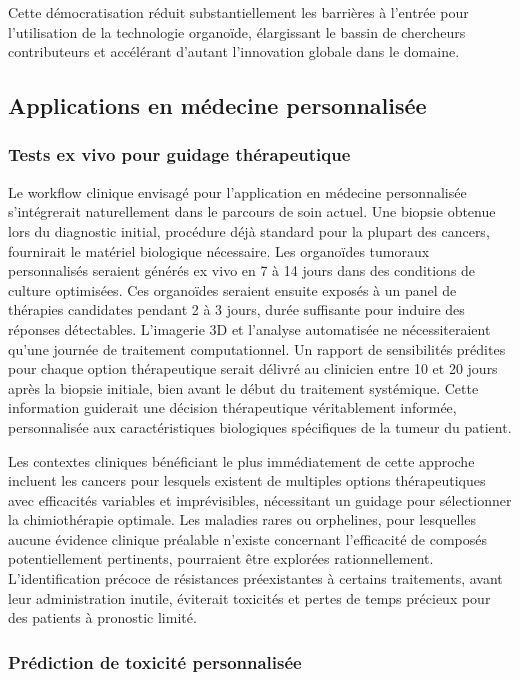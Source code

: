 Cette démocratisation réduit substantiellement les barrières à l'entrée pour l'utilisation de la technologie organoïde, élargissant le bassin de chercheurs contributeurs et accélérant d'autant l'innovation globale dans le domaine.

\subsection{Applications en médecine personnalisée}

\subsubsection{Tests ex vivo pour guidage thérapeutique}

Le workflow clinique envisagé pour l'application en médecine personnalisée s'intégrerait naturellement dans le parcours de soin actuel. Une biopsie obtenue lors du diagnostic initial, procédure déjà standard pour la plupart des cancers, fournirait le matériel biologique nécessaire. Les organoïdes tumoraux personnalisés seraient générés ex vivo en 7 à 14 jours dans des conditions de culture optimisées. Ces organoïdes seraient ensuite exposés à un panel de thérapies candidates pendant 2 à 3 jours, durée suffisante pour induire des réponses détectables. L'imagerie 3D et l'analyse automatisée ne nécessiteraient qu'une journée de traitement computationnel. Un rapport de sensibilités prédites pour chaque option thérapeutique serait délivré au clinicien entre 10 et 20 jours après la biopsie initiale, bien avant le début du traitement systémique. Cette information guiderait une décision thérapeutique véritablement informée, personnalisée aux caractéristiques biologiques spécifiques de la tumeur du patient.

Les contextes cliniques bénéficiant le plus immédiatement de cette approche incluent les cancers pour lesquels existent de multiples options thérapeutiques avec efficacités variables et imprévisibles, nécessitant un guidage pour sélectionner la chimiothérapie optimale. Les maladies rares ou orphelines, pour lesquelles aucune évidence clinique préalable n'existe concernant l'efficacité de composés potentiellement pertinents, pourraient être explorées rationnellement. L'identification précoce de résistances préexistantes à certains traitements, avant leur administration inutile, éviterait toxicités et pertes de temps précieux pour des patients à pronostic limité.

\subsubsection{Prédiction de toxicité personnalisée}

